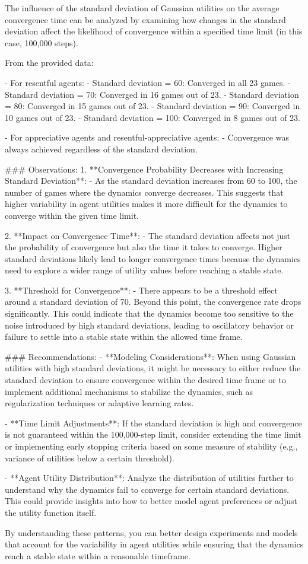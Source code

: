 The influence of the standard deviation of Gaussian utilities on the average convergence time can be analyzed by examining how changes in the standard deviation affect the likelihood of convergence within a specified time limit (in this case, 100,000 steps).

From the provided data:

- For resentful agents:
  - Standard deviation = 60: Converged in all 23 games.
  - Standard deviation = 70: Converged in 16 games out of 23.
  - Standard deviation = 80: Converged in 15 games out of 23.
  - Standard deviation = 90: Converged in 10 games out of 23.
  - Standard deviation = 100: Converged in 8 games out of 23.

- For appreciative agents and resentful-appreciative agents:
  - Convergence was always achieved regardless of the standard deviation.

### Observations:
1. **Convergence Probability Decreases with Increasing Standard Deviation**:
   - As the standard deviation increases from 60 to 100, the number of games where the dynamics converge decreases. This suggests that higher variability in agent utilities makes it more difficult for the dynamics to converge within the given time limit.

2. **Impact on Convergence Time**:
   - The standard deviation affects not just the probability of convergence but also the time it takes to converge. Higher standard deviations likely lead to longer convergence times because the dynamics need to explore a wider range of utility values before reaching a stable state.

3. **Threshold for Convergence**:
   - There appears to be a threshold effect around a standard deviation of 70. Beyond this point, the convergence rate drops significantly. This could indicate that the dynamics become too sensitive to the noise introduced by high standard deviations, leading to oscillatory behavior or failure to settle into a stable state within the allowed time frame.

### Recommendations:
- **Modeling Considerations**: When using Gaussian utilities with high standard deviations, it might be necessary to either reduce the standard deviation to ensure convergence within the desired time frame or to implement additional mechanisms to stabilize the dynamics, such as regularization techniques or adaptive learning rates.
  
- **Time Limit Adjustments**: If the standard deviation is high and convergence is not guaranteed within the 100,000-step limit, consider extending the time limit or implementing early stopping criteria based on some measure of stability (e.g., variance of utilities below a certain threshold).

- **Agent Utility Distribution**: Analyze the distribution of utilities further to understand why the dynamics fail to converge for certain standard deviations. This could provide insights into how to better model agent preferences or adjust the utility function itself.

By understanding these patterns, you can better design experiments and models that account for the variability in agent utilities while ensuring that the dynamics reach a stable state within a reasonable timeframe.